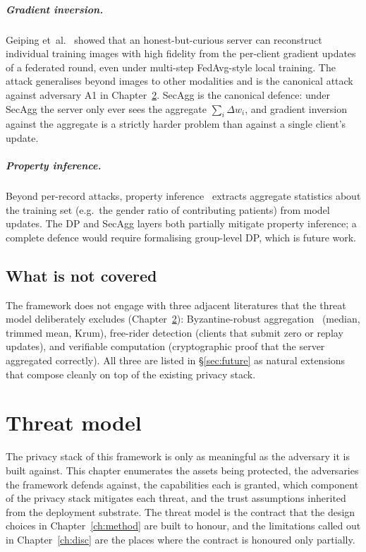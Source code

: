 \documentclass[11pt,a4paper]{report}
\begin{document}
\paragraph{Gradient inversion.} Geiping
et~al.~\cite{geiping2020inverting} showed that an honest-but-curious
server can reconstruct individual training images with high fidelity from
the per-client gradient updates of a federated round, even under
multi-step FedAvg-style local training. The attack generalises beyond
images to other modalities and is the canonical attack against adversary
A1 in Chapter~\ref{ch:threat}. SecAgg is the canonical defence: under
SecAgg the server only ever sees the aggregate $\sum_i \Delta w_i$, and
gradient inversion against the aggregate is a strictly harder problem
than against a single client's update.

\paragraph{Property inference.} Beyond per-record attacks, property
inference~\cite{melis2019exploit} extracts aggregate statistics about the
training set (e.g.\ the gender ratio of contributing patients) from model
updates. The DP and SecAgg layers both partially mitigate property
inference; a complete defence would require formalising group-level DP,
which is future work.

\section{What is not covered}

The framework does not engage with three adjacent literatures that the
threat model deliberately excludes (Chapter~\ref{ch:threat}):
Byzantine-robust aggregation~\cite{blanchard2017krum, yin2018byzantine}
(median, trimmed mean, Krum), free-rider detection (clients that submit
zero or replay updates), and verifiable computation (cryptographic
proof that the server aggregated correctly). All three are listed in
\S\ref{sec:future} as natural extensions that compose cleanly on top of
the existing privacy stack.

\chapter{Threat model}\label{ch:threat}

The privacy stack of this framework is only as meaningful as the adversary
it is built against. This chapter enumerates the assets being protected, the
adversaries the framework defends against, the capabilities each is granted,
which component of the privacy stack mitigates each threat, and the trust
assumptions inherited from the deployment substrate. The threat model is the
contract that the design choices in Chapter~\ref{ch:method} are built to
honour, and the limitations called out in Chapter~\ref{ch:disc} are the
places where the contract is honoured only partially.
\end{document}
